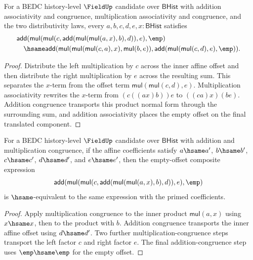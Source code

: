 \begin{theorem}
\label{thm:field-affine-empty-offset-composition-normal-form}
For a BEDC history-level $\FieldUp$ candidate over $\mathsf{BHist}$ with
addition associativity and congruence, multiplication associativity and
congruence, and the two distributivity laws, every $a,b,c,d,e,x:\mathsf{BHist}$
satisfies
$$
\begin{aligned}
&\mathsf{add}(
  \mathsf{mul}(\mathsf{mul}(c,
    \mathsf{add}(\mathsf{mul}(\mathsf{mul}(a,x),b),d)),e),\emp)\\
&\quad\hsame
\mathsf{add}(
  \mathsf{mul}(\mathsf{mul}(\mathsf{mul}(c,a),x),\mathsf{mul}(b,e)),
  \mathsf{add}(\mathsf{mul}(\mathsf{mul}(c,d),e),\emp)).
\end{aligned}
$$
\end{theorem}
\begin{proof}
Distribute the left multiplication by $c$ across the inner affine offset and
then distribute the right multiplication by $e$ across the resulting sum. This
separates the $x$-term from the offset term
$\mathsf{mul}(\mathsf{mul}(c,d),e)$. Multiplication associativity rewrites
the $x$-term from
$(c((ax)b))e$ to $((ca)x)(be)$. Addition congruence transports this product
normal form through the surrounding sum, and addition associativity places the
empty offset on the final translated component.
\end{proof}

\begin{theorem}
\label{thm:field-affine-empty-offset-composition-classifier-congr}
For a BEDC history-level $\FieldUp$ candidate over $\mathsf{BHist}$ with
addition and multiplication congruence, if the affine coefficients satisfy
$a\hsame a'$, $b\hsame b'$, $c\hsame c'$, $d\hsame d'$, and $e\hsame e'$,
then the empty-offset composite expression
$$
\mathsf{add}(
  \mathsf{mul}(\mathsf{mul}(c,
    \mathsf{add}(\mathsf{mul}(\mathsf{mul}(a,x),b),d)),e),\emp)
$$
is \(\hsame\)-equivalent to the same expression with the primed coefficients.
\end{theorem}
\begin{proof}
Apply multiplication congruence to the inner product \(\mathsf{mul}(a,x)\)
using \(x\hsame x\), then to the product with \(b\). Addition congruence
transports the inner affine offset using \(d\hsame d'\). Two further
multiplication-congruence steps transport the left factor \(c\) and right
factor \(e\). The final addition-congruence step uses \(\emp\hsame\emp\) for
the empty offset.
\end{proof}

